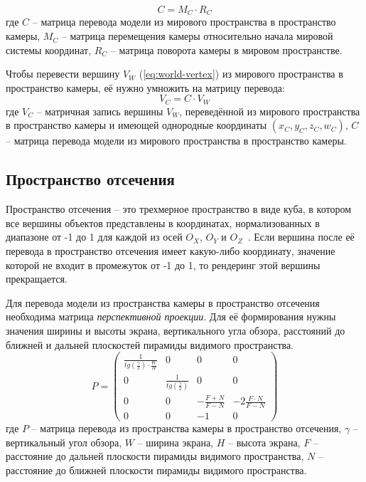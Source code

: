 \begin{equation}
	C = M_C \cdot R_C
\end{equation}
где $C$ -- матрица перевода модели из мирового пространства в пространство камеры, $M_C$ -- матрица перемещения камеры относительно начала мировой системы координат, $R_C$ -- матрица поворота камеры в мировом пространстве.

Чтобы перевести вершину $V_W$ (\ref{eq:world-vertex}) из мирового пространства в пространство камеры, её нужно умножить на матрицу перевода:
\begin{equation}
	V_C = C \cdot V_W
	\label{eq:camera-vertex}
\end{equation}
где $V_C$ -- матричная запись вершины $V_W$, переведённой из мирового пространства в пространство камеры и имеющей однородные координаты $(x_C, y_C, z_C, w_C)$, $C$ -- матрица перевода модели из мирового пространства в пространство камеры. 

\subsection{Пространство отсечения}

Пространство отсечения -- это трехмерное пространство в виде куба, в котором все вершины объектов представлены в координатах, нормализованных в диапазоне от -1 до 1 для каждой из осей $O_X$, $O_Y$ и $O_Z$~\cite{lit14}. Если вершина после её перевода в пространство отсечения имеет какую-либо координату, значение которой не входит в промежуток от -1 до 1, то рендеринг этой вершины прекращается.

Для перевода модели из пространства камеры в пространство отсечения необходима матрица \textit{перспективной проекции}. Для её формирования нужны значения ширины и высоты экрана, вертикального угла обзора, расстояний до ближней и дальней плоскостей пирамиды видимого пространства.
\begin{equation}
	P = 
	\begin{pmatrix}
		\frac{1}{tg(\frac{\gamma}{2}) \cdot \frac{W}{H}} & 0 & 0 & 0 \\
		0 & \frac{1}{tg(\frac{\gamma}{2})} & 0 & 0 \\
		0 & 0 & -\frac{F + N}{F - N} & -2\frac{F \cdot N}{F - N} \\
		0 & 0 & -1 & 0 
	\end{pmatrix}
	\label{eq:clip-matrix}
\end{equation}
где $P$ -- матрица перевода из пространства камеры в пространство отсечения, $\gamma$ -- вертикальный угол обзора, $W$ -- ширина экрана, $H$ -- высота экрана, $F$ -- расстояние до дальней плоскости пирамиды видимого пространства, $N$ -- расстояние до ближней плоскости пирамиды видимого пространства.

